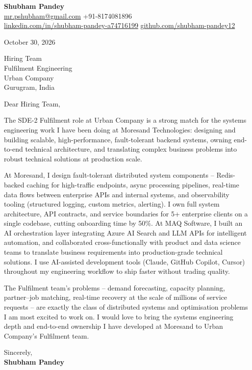 \documentclass[a4paper,11pt]{article}
\begin{document}
\textbf{\Large Shubham Pandey}\\
\href{mailto:mr.pshubham@gmail.com}{mr.pshubham@gmail.com} \quad +91-8174081896\\
\href{https://www.linkedin.com/in/shubham-pandey-a74716199/}{linkedin.com/in/shubham-pandey-a74716199} \quad
\href{https://github.com/shubham-pandey12}{github.com/shubham-pandey12}

\vspace{1em}
October 30, 2026

\vspace{1em}
Hiring Team\\
Fulfilment Engineering\\
Urban Company\\
Gurugram, India

\vspace{1em}
Dear Hiring Team,

The SDE-2 Fulfilment role at Urban Company is a strong match for the systems engineering work I have been doing at Moresand Technologies: designing and building scalable, high-performance, fault-tolerant backend systems, owning end-to-end technical architecture, and translating complex business problems into robust technical solutions at production scale.

At Moresand, I design fault-tolerant distributed system components -- Redis-backed caching for high-traffic endpoints, async processing pipelines, real-time data flows between enterprise APIs and internal systems, and observability tooling (structured logging, custom metrics, alerting). I own full system architecture, API contracts, and service boundaries for 5+ enterprise clients on a single codebase, cutting onboarding time by 50\%. At MAQ Software, I built an AI orchestration layer integrating Azure AI Search and LLM APIs for intelligent automation, and collaborated cross-functionally with product and data science teams to translate business requirements into production-grade technical solutions. I use AI-assisted development tools (Claude, GitHub Copilot, Cursor) throughout my engineering workflow to ship faster without trading quality.

The Fulfilment team's problems -- demand forecasting, capacity planning, partner--job matching, real-time recovery at the scale of millions of service requests -- are exactly the class of distributed systems and optimisation problems I am most excited to work on. I would love to bring the systems engineering depth and end-to-end ownership I have developed at Moresand to Urban Company's Fulfilment team.

\vspace{1em}
Sincerely,\\[0.5em]
\textbf{Shubham Pandey}
\end{document}
